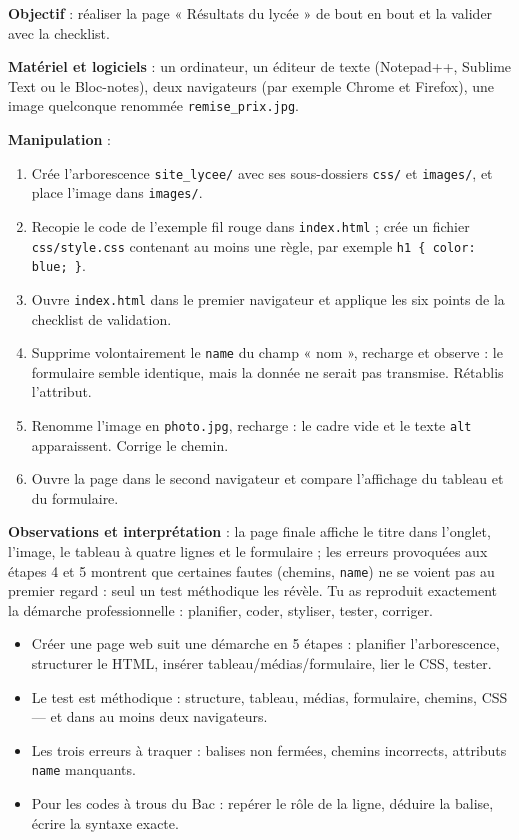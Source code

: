 \documentclass[11pt]{article}
\begin{document}
\begin{experience}
\textbf{Objectif} : réaliser la page « Résultats du lycée » de bout en bout et la valider avec la checklist.

\textbf{Matériel et logiciels} : un ordinateur, un éditeur de texte (Notepad++, Sublime Text ou le Bloc-notes), deux navigateurs (par exemple Chrome et Firefox), une image quelconque renommée \texttt{remise\_prix.jpg}.

\textbf{Manipulation} :
\begin{enumerate}
\item Crée l'arborescence \texttt{site\_lycee/} avec ses sous-dossiers \texttt{css/} et \texttt{images/}, et place l'image dans \texttt{images/}.
\item Recopie le code de l'exemple fil rouge dans \texttt{index.html} ; crée un fichier \texttt{css/style.css} contenant au moins une règle, par exemple \texttt{h1 \{ color: blue; \}}.
\item Ouvre \texttt{index.html} dans le premier navigateur et applique les six points de la checklist de validation.
\item Supprime volontairement le \texttt{name} du champ « nom », recharge et observe : le formulaire semble identique, mais la donnée ne serait pas transmise. Rétablis l'attribut.
\item Renomme l'image en \texttt{photo.jpg}, recharge : le cadre vide et le texte \texttt{alt} apparaissent. Corrige le chemin.
\item Ouvre la page dans le second navigateur et compare l'affichage du tableau et du formulaire.
\end{enumerate}

\textbf{Observations et interprétation} : la page finale affiche le titre dans l'onglet, l'image, le tableau à quatre lignes et le formulaire ; les erreurs provoquées aux étapes 4 et 5 montrent que certaines fautes (chemins, \texttt{name}) ne se voient pas au premier regard : seul un test méthodique les révèle. Tu as reproduit exactement la démarche professionnelle : planifier, coder, styliser, tester, corriger.
\end{experience}

\begin{aretenir}
\begin{itemize}
\item Créer une page web suit une démarche en 5 étapes : planifier l'arborescence, structurer le HTML, insérer tableau/médias/formulaire, lier le CSS, tester.
\item Le test est méthodique : structure, tableau, médias, formulaire, chemins, CSS — et dans au moins deux navigateurs.
\item Les trois erreurs à traquer : balises non fermées, chemins incorrects, attributs \texttt{name} manquants.
\item Pour les codes à trous du Bac : repérer le rôle de la ligne, déduire la balise, écrire la syntaxe exacte.
\end{itemize}
\end{aretenir}
\end{document}
